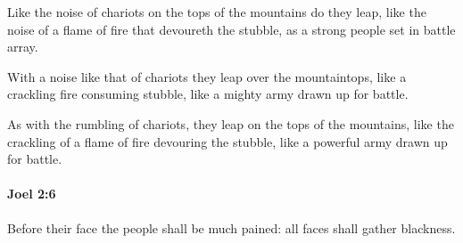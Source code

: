			\begin{versebox}
					\item[BHS] 
					\item[LXX] 
					\item[ASV] Like the noise of chariots on the tops of the mountains do they leap, like the noise of a flame of fire that devoureth the stubble, as a strong people set in battle array.
					\item[NIV] With a noise like that of chariots they leap over the mountaintops, like a crackling fire consuming stubble, like a mighty army drawn up for battle.
					\item[NRSV] As with the rumbling of chariots, they leap on the tops of the mountains, like the crackling of a flame of fire devouring the stubble, like a powerful army drawn up for battle.
			\end{versebox}

		\paragraph{Joel 2:6} %
			\label{JOEL-2-6}

			Before their face the people shall be much pained: all faces shall gather blackness.

